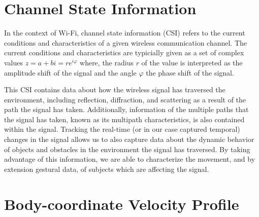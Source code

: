\section{Channel State Information}

In the context of Wi-Fi, channel state information (CSI) refers to the current conditions and characteristics of a given wireless communication channel.
The current conditions and characteristics are typicially given as a set of complex values $z = a + bi = re^{i \varphi}$ where, the radius $r$ of the value is interpreted as the amplitude shift of the signal and the angle $\varphi$ the phase shift of the signal.

This CSI contains data about how the wireless signal has traversed the environment, including reflection, diffraction, and scattering as a result of the path the signal has taken.
Additionally, information of the multiple paths that the signal has taken, known as its multipath characteristics, is also contained within the signal.
Tracking the real-time (or in our case captured temporal) changes in the signal allows us to also capture data about the dynamic behavior of objects and obstacles in the environment the signal has traversed. By taking advantage of this information, we are able to characterize the movement, and by extension gestural data, of subjects which are affecting the signal.

\section{Body-coordinate Velocity Profile}\label{sec:background-bvp}


